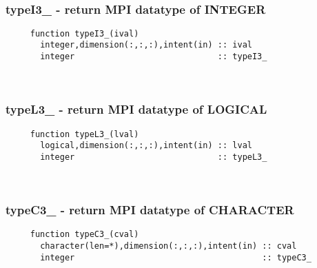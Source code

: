  
\mbox{}\hrulefill\ 

  \subsubsection{typeI3\_ - return MPI datatype of INTEGER}

\begin{verbatim} 
     function typeI3_(ival)
       integer,dimension(:,:,:),intent(in) :: ival
       integer                             :: typeI3_
 \end{verbatim}%
 
 
\mbox{}\hrulefill\ 

  \subsubsection{typeL3\_ - return MPI datatype of LOGICAL}

\begin{verbatim} 
     function typeL3_(lval)
       logical,dimension(:,:,:),intent(in) :: lval
       integer                             :: typeL3_
 \end{verbatim}%
 
 
\mbox{}\hrulefill\ 

  \subsubsection{typeC3\_ - return MPI datatype of CHARACTER}

\begin{verbatim} 
     function typeC3_(cval)
       character(len=*),dimension(:,:,:),intent(in) :: cval
       integer                                      :: typeC3_
 \end{verbatim}%
 

